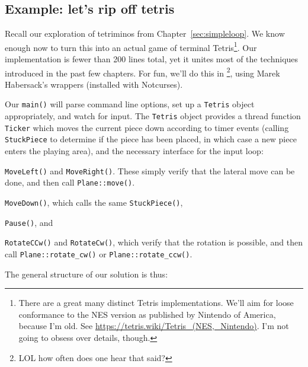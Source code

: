 \subsection{Example: let's rip off tetris}
\label{sec:casestudy}
Recall our exploration of tetriminos from Chapter~\ref{sec:simpleloop}. We
know enough now to turn this into an actual game of terminal Tetris\footnote{There
are a great many distinct Tetris implementations. We'll aim for loose
conformance to the NES version as published by Nintendo of America, because
I'm old. See \url{https://tetris.wiki/Tetris_(NES,_Nintendo)}. I'm not going
to obsess over details, though.}. Our implementation is fewer than 200 lines
total, yet it unites most of the techniques introduced in the past few
chapters. For fun, we'll do this in \CC\footnote{LOL how often does one hear
that said?}, using Marek Habersack's \CC wrappers (installed with Notcurses).

Our \texttt{main()} will parse command line options, set up a \texttt{Tetris}
object appropriately, and watch for input. The \texttt{Tetris} object provides
a thread function \texttt{Ticker} which moves the current piece down according
to timer events (calling \texttt{StuckPiece} to determine if the piece has been
placed, in which case a new piece enters the playing area), and the necessary
interface for the input loop:

\begin{denseitemize}
\item{\texttt{MoveLeft()} and \texttt{MoveRight()}. These simply verify that
       the lateral move can be done, and then call \texttt{Plane::move()}.}
\item{\texttt{MoveDown()}, which calls the same \texttt{StuckPiece()},}
\item{\texttt{Pause()}, and}
\item{\texttt{RotateCCw()} and \texttt{RotateCw()}, which verify that the rotation
      is possible, and then call \texttt{Plane::rotate\_cw()} or \texttt{Plane::rotate\_ccw()}.}
\end{denseitemize}

The general structure of our solution is thus:

